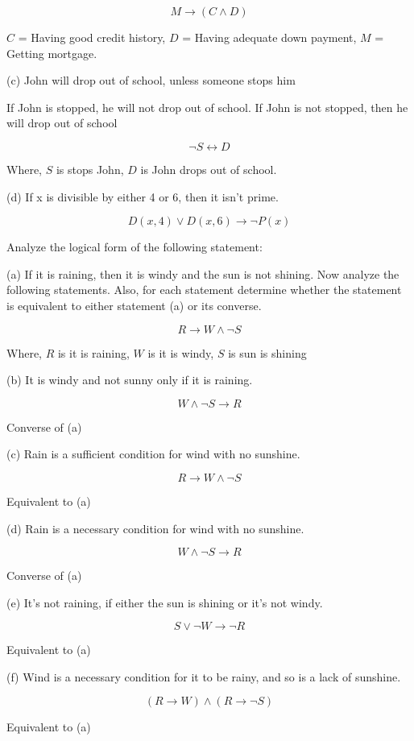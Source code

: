 \documentclass[11pt]{article}
\newcommand{\then}{\rightarrow}
\newcommand{\bicond}{\leftrightarrow}
\begin{document}
$$M \then (C \wedge D)$$

$C$ = Having good credit history,
$D$ = Having adequate down payment,
$M$ = Getting mortgage.

\noindent (c) John will drop out of school, unless someone stops him

If John is stopped, he will not drop out of school. If John is not stopped, then 
he will drop out of school

$$\neg S \bicond D$$

Where,
$S$ is stops John,
$D$ is John drops out of school.

\noindent (d) If x is divisible by either 4 or 6, then it isn't prime.

$$D(x, 4) \vee D(x, 6) \then \neg P(x)$$

\noindent Analyze the logical form of the following statement:


\noindent (a) If it is raining, then it is windy and the sun is not shining.
Now analyze the following statements. Also, for each statement determine
whether the statement is equivalent to either statement (a) or its converse.

$$R \then W \wedge \neg S$$

Where,
$R$ is it is raining,
$W$ is it is windy,
$S$ is sun is shining

\noindent (b) It is windy and not sunny only if it is raining.

$$W \wedge \neg S \then R$$

Converse of (a)

\noindent (c) Rain is a sufficient condition for wind with no sunshine.

$$R \then W \wedge \neg S$$

Equivalent to (a)

\noindent (d) Rain is a necessary condition for wind with no sunshine.

$$W \wedge \neg S \then R$$

Converse of (a)

\noindent (e) It's not raining, if either the sun is shining or it's not windy.

$$S \vee \neg W \then \neg R$$

Equivalent to (a)

\noindent (f) Wind is a necessary condition for it to be rainy, and so is a lack of
sunshine.

$$(R \then W) \wedge (R \then \neg S)$$ %

Equivalent to (a)
\end{document}

